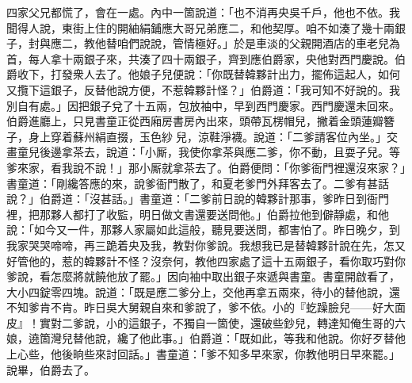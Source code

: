 四家父兄都慌了，會在一處。內中一箇說道：「也不消再央吳千戶，他也不依。我聞得人說，東街上住的開紬絹鋪應大哥兄弟應二，和他契厚。咱不如湊了幾十兩銀子，封與應二，教他替咱們說說，管情極好。」於是車淡的父親開酒店的車老兒為首，每人拿十兩銀子來，共湊了四十兩銀子，齊到應伯爵家，央他對西門慶說。伯爵收下，打發衆人去了。他娘子兒便說：「你既替韓夥計出力，擺佈這起人，如何又攬下這銀子，反替他說方便，不惹韓夥計怪？」伯爵道：「我可知不好說的。我別自有處。」因把銀子兌了十五兩，包放袖中，早到西門慶家。西門慶還未回來。伯爵進廳上，只見書童正從西廂房書房內出來，頭帶瓦楞帽兒，撇着金頭蓮瓣簪子，身上穿着蘇州絹直掇，玉色紗𧜽兒，涼鞋淨襪。說道：「二爹請客位內坐。」交畫童兒後邊拿茶去，說道：「小厮，我使你拿茶與應二爹，你不動，且耍子兒。等爹來家，看我說不說！」那小厮就拿茶去了。伯爵便問：「你爹衙門裡還沒來家？」書童道：「剛纔答應的來，說爹衙門散了，和夏老爹門外拜客去了。二爹有甚話說？」伯爵道：「沒甚話。」書童道：「二爹前日說的韓夥計那事，爹昨日到衙門裡，把那夥人都打了收監，明日做文書還要送問他。」伯爵拉他到僻靜處，和他說：「如今又一件，那夥人家屬如此這般，聽見要送問，都害怕了。昨日晚夕，到我家哭哭啼啼，再三跪着央及我，教對你爹說。我想我已是替韓夥計說在先，怎又好管他的，惹的韓夥計不怪？沒奈何，教他四家處了這十五兩銀子，看你取巧對你爹說，看怎麼將就饒他放了罷。」因向袖中取出銀子來遞與書童。書童開啟看了，大小四錠零四塊。說道：「既是應二爹分上，交他再拿五兩來，待小的替他說，還不知爹肯不肯。昨日吳大舅親自來和爹說了，爹不依。小的『虼躁臉兒——好大面皮』！實對二爹說，小的這銀子，不獨自一箇使，還破些鈔兒，轉達知俺生哥的六娘，遶箇灣兒替他說，纔了他此事。」{}伯爵道：「既如此，等我和他說。你好歹替他上心些，他後晌些來討回話。」書童道：「爹不知多早來家，你教他明日早來罷。」說畢，伯爵去了。


